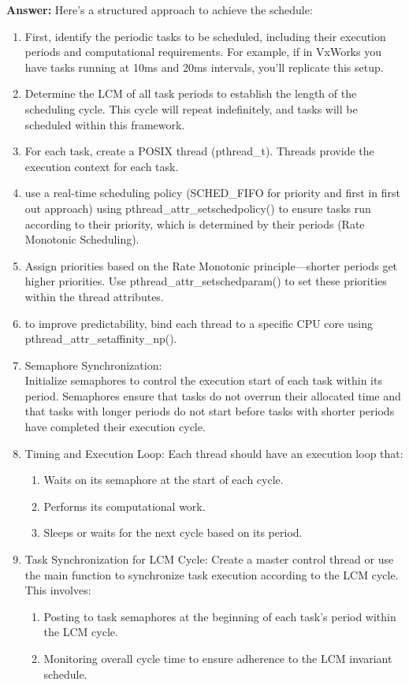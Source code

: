 \documentclass[a4paper,11pt]{article}%
\newenvironment{qanda}{\setlength{\parindent}{0pt}}{\bigskip}
\newcommand{\A}{\par\textbf{Answer: } \normalfont}
\begin{document}
\begin{qanda}
\begin{enumerate}
\begin{enumerate}
				\A
				Here's a structured approach to achieve the schedule:
				\begin{enumerate}
					\item 	First, identify the periodic tasks to be scheduled, including their execution periods and computational requirements. For example, if in VxWorks you have tasks running at 10ms and 20ms intervals, you'll replicate this setup.
					\item 	Determine the LCM of all task periods to establish the length of the scheduling cycle. This cycle will repeat indefinitely, and tasks will be scheduled within this framework.
					\item 	For each task, create a POSIX thread (pthread\_t). Threads provide the execution context for each task.
					\item use a real-time scheduling policy (SCHED\_FIFO for priority and first in first out approach) using pthread\_attr\_setschedpolicy() to ensure tasks run according to their priority, which is determined by their periods (Rate Monotonic Scheduling).
					\item  Assign priorities based on the Rate Monotonic principle—shorter periods get higher priorities. Use pthread\_attr\_setschedparam() to set these priorities within the thread attributes.
					\item to improve predictability, bind each thread to a specific CPU core using pthread\_attr\_setaffinity\_np(). 
					\item Semaphore Synchronization:\\
					Initialize semaphores to control the execution start of each task within its period. Semaphores ensure that tasks do not overrun their allocated time and that tasks with longer periods do not start before tasks with shorter periods have completed their execution cycle.

					\item Timing and Execution Loop:
					Each thread should have an execution loop that:
					\begin{enumerate}
						\item Waits on its semaphore at the start of each cycle.
						\item Performs its computational work.
						\item Sleeps or waits for the next cycle based on its period.
					\end{enumerate}
					
					

					\item Task Synchronization for LCM Cycle:
					Create a master control thread or use the main function to synchronize task execution according to the LCM cycle. This involves:
					\begin{enumerate}
						\item Posting to task semaphores at the beginning of each task's period within the LCM cycle.
						\item Monitoring overall cycle time to ensure adherence to the LCM invariant schedule.
					\end{enumerate}
					

\end{enumerate}
\end{enumerate}
\end{enumerate}
\end{qanda}
\end{document}

